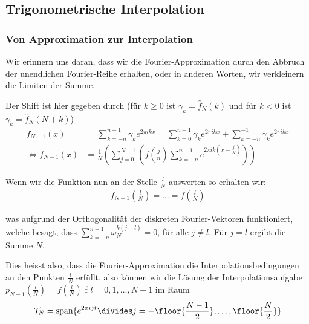 \newsection
\subsection{Trigonometrische Interpolation}
\subsubsection{Von Approximation zur Interpolation}
Wir erinnern uns daran, dass wir die Fourier-Approximation durch den Abbruch der unendlichen Fourier-Reihe erhalten, oder in anderen Worten, wir verkleinern die Limiten der Summe.


Der Shift ist hier gegeben durch (für $k \geq 0$ ist $\gamma_k = \hat{f}_N(k)$ und für $k < 0$ ist $\gamma_k = \hat{f}_N(N + k)$)
\begin{align*}
    f_{N - 1}(x)                 & = \sum_{k = -n}^{n - 1} \gamma_k e^{2 \pi ikx} = \sum_{k = 0}^{n - 1} \gamma_k e^{2\pi ikx} + \sum_{k = -n}^{-1} \gamma_k e^{2\pi ikx} \\
    \Leftrightarrow f_{N - 1}(x) & = \frac{1}{N} \left( \sum_{j = 0}^{N - 1} \left( f\left( \frac{j}{n} \right)
        \sum_{k = -n}^{n - 1} e^{2\pi ik \left( x - \frac{j}{N} \right)} \right) \right)
\end{align*}

\vspace{-1pc}

Wenn wir die Funktion nun an der Stelle $\frac{l}{N}$ auswerten so erhalten wir:
\rmvspace
\begin{align*}
    f_{N - 1}\left( \frac{l}{N} \right) = \ldots = f\left( \frac{l}{N} \right)
\end{align*}

\vspace{-1.8pc}
was aufgrund der Orthogonalität der diskreten Fourier-Vektoren funktioniert, welche besagt, dass $\displaystyle \sum_{k = -n}^{n - 1} \omega_N^{k(j - l)} = 0$, für alle $j \neq l$.
Für $j = l$ ergibt die Summe $N$.

Dies heisst also, dass die Fourier-Approximation die Interpolationsbedingungen an den Punkten $\frac{l}{N}$ erfüllt,
also können wir die Lösung der Interpolationsaufgabe $p_{N - 1} \left( \frac{l}{N} \right) = f\left( \frac{l}{N} \right)$ f $l = 0, 1, \ldots, N - 1$ im Raum
\rmvspace
\begin{align*}
    \mathcal{T}_N = \text{span}\{ e^{2\pi ijt} \divides j = - \floor{\frac{N - 1}{2}}, \ldots, \floor{\frac{N}{2}} \}
\end{align*}


